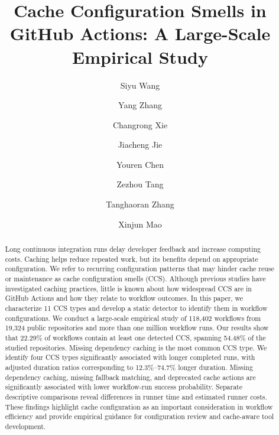\documentclass[smallextended]{svjour3}
\begin{document}
\title{Cache Configuration Smells in GitHub Actions: A Large-Scale Empirical Study}

\author{
    Siyu Wang \and
    Yang Zhang \and
    Changrong Xie \and
    Jiacheng Jie \and
    Youren Chen \and
    Zezhou Tang \and
    Tanghaoran Zhang \and
    Xinjun Mao
}


\date{}

\maketitle

\begin{abstract}
Long continuous integration runs delay developer feedback and increase computing costs. Caching helps reduce repeated work, but its benefits depend on appropriate configuration. We refer to recurring configuration patterns that may hinder cache reuse or maintenance as cache configuration smells (CCS). Although previous studies have investigated caching practices, little is known about how widespread CCS are in GitHub Actions and how they relate to workflow outcomes. In this paper, we characterize 11 CCS types and develop a static detector to identify them in workflow configurations. We conduct a large-scale empirical study of 118,402 workflows from 19,324 public repositories and more than one million workflow runs. Our results show that 22.29\% of workflows contain at least one detected CCS, spanning 54.48\% of the studied repositories. Missing dependency caching is the most common CCS type. We identify four CCS types significantly associated with longer completed runs, with adjusted duration ratios corresponding to 12.3\%--74.7\% longer duration. Missing dependency caching, missing fallback matching, and deprecated cache actions are significantly associated with lower workflow-run success probability. Separate descriptive comparisons reveal differences in runner time and estimated runner costs. These findings highlight cache configuration as an important consideration in workflow efficiency and provide empirical guidance for configuration review and cache-aware tool development.


\end{abstract}
\end{document}
